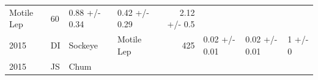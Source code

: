 \documentclass[fleqn,10pt]{wlpeerj} %
\begin{document}
\begin{longtable}[]{@{}llllrlll@{}}
\begin{minipage}[t]{0.11\columnwidth}
Motile Lep\strut
\end{minipage} & \begin{minipage}[t]{0.04\columnwidth}\raggedleft\strut
60\strut
\end{minipage} & \begin{minipage}[t]{0.14\columnwidth}\raggedright\strut
0.88 +/- 0.34\strut
\end{minipage} & \begin{minipage}[t]{0.14\columnwidth}\raggedright\strut
0.42 +/- 0.29\strut
\end{minipage} & \begin{minipage}[t]{0.14\columnwidth}\raggedright\strut
2.12 +/- 0.5\strut
\end{minipage}\tabularnewline
\begin{minipage}[t]{0.09\columnwidth}\raggedright\strut
2015\strut
\end{minipage} & \begin{minipage}[t]{0.06\columnwidth}\raggedright\strut
DI\strut
\end{minipage} & \begin{minipage}[t]{0.06\columnwidth}\raggedright\strut
Sockeye\strut
\end{minipage} & \begin{minipage}[t]{0.11\columnwidth}\raggedright\strut
Motile Lep\strut
\end{minipage} & \begin{minipage}[t]{0.04\columnwidth}\raggedleft\strut
425\strut
\end{minipage} & \begin{minipage}[t]{0.14\columnwidth}\raggedright\strut
0.02 +/- 0.01\strut
\end{minipage} & \begin{minipage}[t]{0.14\columnwidth}\raggedright\strut
0.02 +/- 0.01\strut
\end{minipage} & \begin{minipage}[t]{0.14\columnwidth}\raggedright\strut
1 +/- 0\strut
\end{minipage}\tabularnewline
\begin{minipage}[t]{0.09\columnwidth}\raggedright\strut
2015\strut
\end{minipage} & \begin{minipage}[t]{0.06\columnwidth}\raggedright\strut
JS\strut
\end{minipage} & \begin{minipage}[t]{0.06\columnwidth}\raggedright\strut
Chum\strut
\end{minipage} & \begin{minipage}[t]{0.11\columnwidth}\raggedright\strut

\end{minipage}
\end{longtable}
\end{document}
